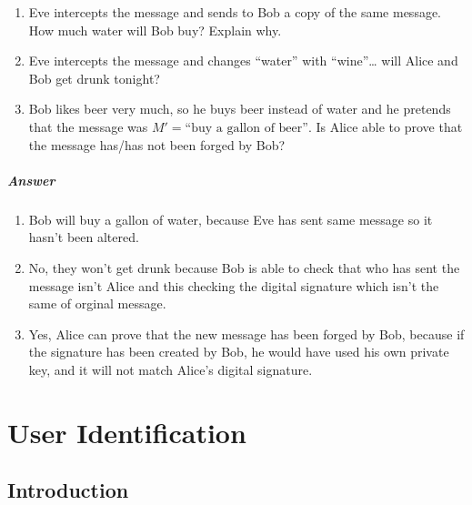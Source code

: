 \documentclass{article}
\begin{document}
                                \begin{enumerate}
                                    \item Eve intercepts the message and sends to Bob a copy of the same message. How much water will Bob buy? Explain why.
                                    \item Eve intercepts the message and changes ``water'' with ``wine''… will Alice and Bob get drunk tonight?
                                    \item Bob likes beer very much, so he buys beer instead of water and he pretends that the message was \( M' = \text{``buy a gallon of beer''} \). Is Alice able to prove that the message has/has not been forged by Bob?
                                \end{enumerate}
                                \subparagraph{Answer}
                                 \begin{enumerate}
                                    \item Bob will buy a gallon of water, because Eve has sent same message so it hasn't been altered.
                                    \item No, they won't get drunk because Bob is able to check that who has sent the message isn't Alice and this checking the digital signature which isn't the same of orginal message. 
                                    \item Yes, Alice can prove that the new message has been forged by Bob, because if the signature has been created by Bob, he would have used his own private key, and it will not match Alice's digital signature. 
                                 \end{enumerate}
                                 \newpage
\section{User Identification}
        \subsection{Introduction}
\end{document}
